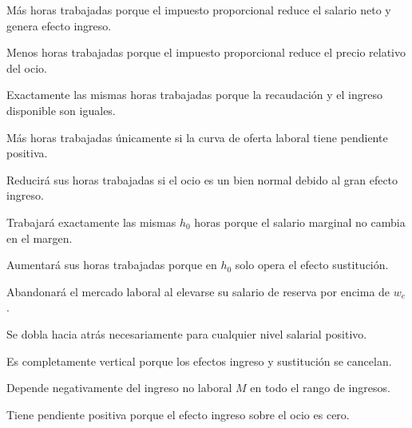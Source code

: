 \begin{opts}
    \item Más horas trabajadas porque el impuesto proporcional reduce el salario neto y genera efecto ingreso.
    \item Menos horas trabajadas porque el impuesto proporcional reduce el precio relativo del ocio.
    \item Exactamente las mismas horas trabajadas porque la recaudación y el ingreso disponible son iguales.
    \item Más horas trabajadas únicamente si la curva de oferta laboral tiene pendiente positiva.
\end{opts}

\begin{opts}
    \item Reducirá sus horas trabajadas si el ocio es un bien normal debido al gran efecto ingreso.
    \item Trabajará exactamente las mismas $h_0$ horas porque el salario marginal no cambia en el margen.
    \item Aumentará sus horas trabajadas porque en $h_0$ solo opera el efecto sustitución.
    \item Abandonará el mercado laboral al elevarse su salario de reserva por encima de $w_e$.
\end{opts}

\begin{opts}
    \item Se dobla hacia atrás necesariamente para cualquier nivel salarial positivo.
    \item Es completamente vertical porque los efectos ingreso y sustitución se cancelan.
    \item Depende negativamente del ingreso no laboral $M$ en todo el rango de ingresos.
    \item Tiene pendiente positiva porque el efecto ingreso sobre el ocio es cero.
\end{opts}

